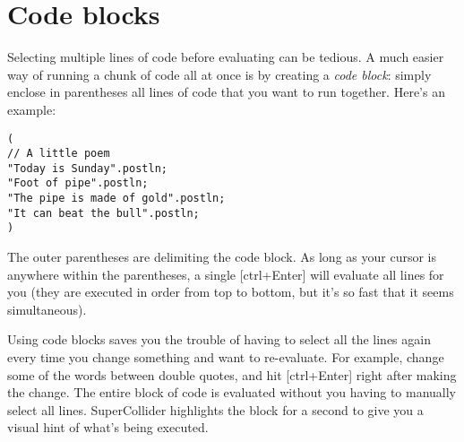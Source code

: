 \section{Code blocks}
\label{sec:code-block}

Selecting multiple lines of code before evaluating can be tedious. A much easier way of running a chunk of code all at once is by creating a \textit{code block}: simply enclose in parentheses all lines of code that you want to run together. Here's an example:
 
\begin{lstlisting}[style=SuperCollider-IDE, basicstyle=\scttfamily\footnotesize]
(
// A little poem
"Today is Sunday".postln;
"Foot of pipe".postln;
"The pipe is made of gold".postln;
"It can beat the bull".postln;
)
\end{lstlisting}

The outer parentheses are delimiting the code block. As long as your cursor is anywhere within the parentheses, a single [ctrl+Enter] will evaluate all lines for you (they are executed in order from top to bottom, but it's so fast that it seems simultaneous).

Using code blocks saves you the trouble of having to select all the lines again every time you change something and want to re-evaluate. For example, change some of the words between double quotes, and hit [ctrl+Enter] right after making the change. The entire block of code is evaluated without you having to manually select all lines. SuperCollider highlights the block for a second to give you a visual hint of what's being executed.
